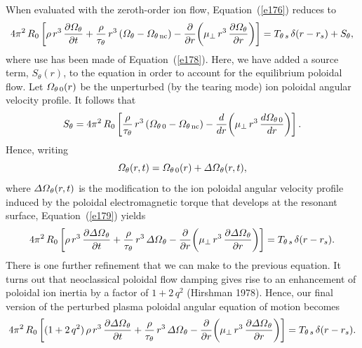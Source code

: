 \documentclass[notitlepage,12pt]{article}
\begin{document}
When evaluated with the zeroth-order ion flow, Equation~(\ref{e176}) reduces to 
\begin{equation}\label{e179}
4\pi^2\,R_0\left[\rho\,r^3\,\frac{\partial {\mit\Omega}_\theta}{\partial t}+ \frac{\rho}{\tau_\theta}\,r^3\,({\mit\Omega}_\theta-{\mit\Omega}_{\theta\,{\rm nc}}) -\frac{\partial}{\partial r}\!\left(\mu_\perp\,r^3\,\frac{\partial{\mit\Omega}_\theta}{\partial r}\right)\right]
=T_{\theta\,s}\,\delta(r-r_s)+ S_\theta,
\end{equation}
where use has been made of Equation~(\ref{e178}). 
Here, we have added a source term, $S_\theta(r)$, to the equation in order to account for the equilibrium poloidal flow. Let ${\mit\Omega}_{\theta\,0}(r)$ be the 
unperturbed (by the tearing mode) ion poloidal angular velocity profile. It follows that 
\begin{equation}
S_\theta = 4\pi^2\,R_0\left[ \frac{\rho}{\tau_\theta}\,r^3\,({\mit\Omega}_{\theta\,0}-{\mit\Omega}_{\theta\,{\rm nc}}) -\frac{d}{d r}\!\left(\mu_\perp\,r^3\,\frac{d{\mit\Omega}_{\theta\,0}}{d r}\right)\right].
\end{equation}
Hence, writing
\begin{equation}
{\mit\Omega}_\theta(r,t)= {\mit\Omega}_{\theta\,0}(r) + {\mit\Delta\Omega}_\theta(r,t),
\end{equation}
where ${\mit\Delta\Omega}_{\theta}(r,t)$ is the  modification to the ion poloidal angular velocity profile
induced by the poloidal electromagnetic torque that develops at the resonant surface, Equation~(\ref{e179})
yields 
\begin{equation}
4\pi^2\,R_0\left[\rho\,r^3\,\frac{\partial {\mit\Delta\Omega}_\theta}{\partial t}+ \frac{\rho}{\tau_\theta}\,r^3\,{\mit\Delta\Omega}_\theta-\frac{\partial}{\partial r}\!\left(\mu_\perp\,r^3\,\frac{\partial{\mit\Delta\Omega}_\theta}{\partial r}\right)\right]
=T_{\theta\,s}\,\delta(r-r_s).
\end{equation}
There is one further refinement that we can make to the previous equation. It turns out that neoclassical poloidal
flow damping gives rise to an enhancement of poloidal ion inertia by a factor of $1+2\,q^2$ (Hirshman 1978). Hence,
our final version of the perturbed plasma poloidal angular equation of motion becomes 
\begin{equation}\label{e182}
4\pi^2\,R_0\left[(1+2\,q^2)\,\rho\,r^3\,\frac{\partial {\mit\Delta\Omega}_\theta}{\partial t}+ \frac{\rho}{\tau_\theta}\,r^3\,{\mit\Delta\Omega}_\theta-\frac{\partial}{\partial r}\!\left(\mu_\perp\,r^3\,\frac{\partial{\mit\Delta\Omega}_\theta}{\partial r}\right)\right]
=T_{\theta\,s}\,\delta(r-r_s).
\end{equation}
\end{document}
